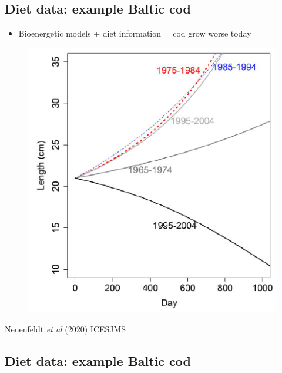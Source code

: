 \documentclass[
  letterpaper,
  DIV=11,
  numbers=noendperiod]{scrartcl}
\providecommand{\tightlist}{%
  \setlength{\itemsep}{0pt}\setlength{\parskip}{0pt}}\usepackage{longtable,booktabs,array}
\begin{document}
\hypertarget{diet-data-example-baltic-cod-2}{%
\subsection{Diet data: example Baltic
cod}\label{diet-data-example-baltic-cod-2}}

\begin{itemize}
\tightlist
\item
  Bioenergetic models + diet information = cod grow worse today
\end{itemize}

\begin{figure}

{\centering \includegraphics{images/neuen.png}

}

\end{figure}

Neuenfeldt \emph{et al} (2020) ICESJMS

\hypertarget{diet-data-example-baltic-cod-3}{%
\subsection{Diet data: example Baltic
cod}\label{diet-data-example-baltic-cod-3}}
\end{document}
